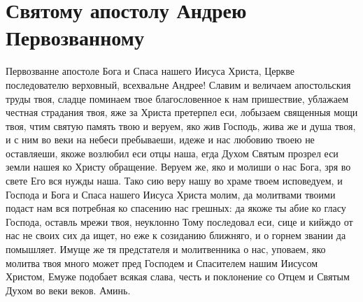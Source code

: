 \section{Святому апостолу Андрею Первозванному}\begin{mymulticols}



Первозванне апостоле Бога и Спаса нашего Иисуса Христа, Церкве последователю верховный, всехвальне Андрее! Славим и величаем апостольския труды твоя, сладце поминаем твое благословенное к нам пришествие, ублажаем честная страдания твоя, яже за Христа претерпел еси, лобызаем священныя мощи твоя, чтим святую память твою и веруем, яко жив Господь, жива же и душа твоя, и с ним во веки на небеси пребываеши, идеже и нас любовию твоею не оставляеши, якоже возлюбил еси отцы наша, егда Духом Святым прозрел еси земли нашея ко Христу обращение. Веруем же, яко и молиши о нас Бога, зря во свете Его вся нужды наша. Тако сию веру нашу во храме твоем исповедуем, и Господа и Бога и Спаса нашего Иисуса Христа молим, да молитвами твоими подаст нам вся потребная ко спасению нас грешных: да якоже ты абие ко гласу Господа, оставль мрежи твоя, неуклонно Тому последовал еси, сице и кийждо от нас не своих сих да ищет, но еже к созиданию ближняго, и о горнем звании да помышляет. Имуще же тя предстателя и молитвенника о нас, уповаем, яко молитва твоя много может пред Господем и Спасителем нашим Иисусом Христом, Емуже подобает всякая слава, честь и поклонение со Отцем и Святым Духом во веки веков. Аминь.

\end{mymulticols}

\mychapterending





